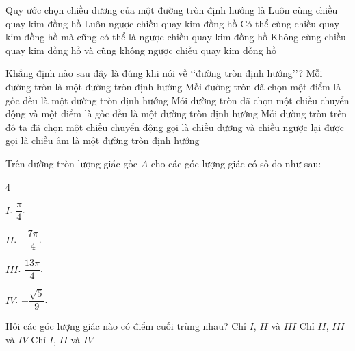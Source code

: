 

\begin{ex}%
	Quy ước chọn chiều dương của một đường tròn định hướng là 
	 \choice
		{Luôn cùng chiều quay kim đồng  hồ}
		{\True Luôn ngược chiều quay kim đồng  hồ}
		{Có  thể cùng chiều quay kim đồng hồ mà cũng có thể là ngược chiều quay kim đồng hồ}
		{Không cùng chiều quay kim  đồng hồ và cũng không ngược chiều quay kim đồng hồ}
\end{ex}

\begin{ex}%
	Khẳng định nào sau đây là đúng khi nói về \lq\lq đường  tròn định hướng\rq\rq?
	 \choice
		{ Mỗi đường tròn  là một đường tròn định hướng}
		{ Mỗi đường tròn đã chọn một điểm là gốc đều là một  đường tròn định hướng}
		{ Mỗi đường tròn đã chọn một chiều chuyển động và một điểm là gốc đều là một  đường tròn định hướng}
		{\True Mỗi đường tròn trên đó ta đã chọn một chiều chuyển động gọi là chiều dương và chiều ngược lại được gọi là chiều âm là một đường tròn định hướng} 
\end{ex}

\begin{ex}%
	Trên đường  tròn lượng giác gốc $A$ cho các góc lượng giác có số đo như sau:
	\begin{enumEX}[I.]{4}
		\item  $I$. $\dfrac{\pi}{4}$.
		\item  $II$. $-\dfrac{7\pi}{4}$.
		\item $III$. $\dfrac{13\pi}{4}$. 
		\item  $IV$. $-\dfrac{\sqrt{5}}{9}$.
	\end{enumEX}
	Hỏi  các góc lượng giác nào có điểm cuối trùng nhau?
		{Chỉ  $I$, $II$ và $III$}
		 {Chỉ $II$, $III$ và $IV$}
		{\True Chỉ $I$, $II$ và  $IV$}
\end{ex}

